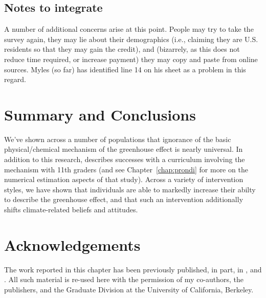 \subsection{Notes to integrate}

A number of additional concerns arise at this point. People may try to take the
survey again, they may lie about their demographics (i.e., claiming they are
U.S. residents so that they may gain the credit), and (bizarrely, as this does
not reduce time required, or increase payment) they may copy and paste from
online sources. Myles (so far) has identified line 14 on his sheet as a problem
in this regard.

\section{Summary and Conclusions}

We've shown across a number of populations that ignorance of the basic
physical/chemical mechanism of the greenhouse effect is nearly universal. In
addition to this research, \textcite{felipe_numerical_2012} describes successes
with a curriculum involving the mechanism with 11th graders (and see
Chapter~\ref{chap:prondi} for more on the numerical estimation aspects of that
study). Across a variety of intervention styles, we have shown that individuals
are able to markedly increase their abilty to describe the greenhouse effect,
and that such an intervention additionally shifts climate-related beliefs and
attitudes.



\section{Acknowledgements}

The work reported in this chapter has been previously published, in part, in
\textcite{ranney_improving_2012_f,ranney_changing_2012}, and
\textcite{clark_knowledge_inpress}.  All such material is re-used here with the
permission of my co-authors, the publishers, and the Graduate Division at the
University of California, Berkeley.
